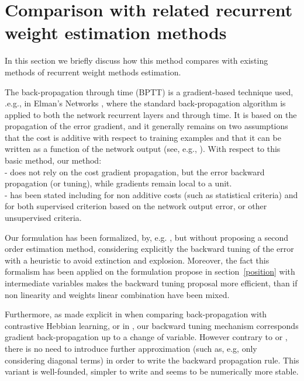 \section{Comparison with related recurrent weight estimation methods} \label{backpropag}

In this section we briefly discuss how this method compares with existing methods of recurrent weight methods estimation.

The back-propagation through time (BPTT) is a gradient-based technique used, .e.g., in Elman's Networks \cite{elman:90}, where the standard back-propagation algorithm is applied to both the network recurrent layers and through time. It is based on the propagation of the error gradient, and it generally remains on two assumptions that the cost is additive with respect to training examples and that it can be written as a function of the network output (see, e.g., \cite{Nielsen2015}). With respect to this basic method, our method:
\\- does not rely on the cost gradient propagation, but the error backward propagation (or tuning), while gradients remain local to a unit.
\\- has been stated including for non additive costs (such as statistical criteria) and for both supervised criterion based on the network output error, or other unsupervised criteria.

Our formulation has been formalized, by, e.g. \cite{cun_theoretical_1988}, but without proposing a second order estimation method, considering explicitly the backward tuning of the error with a heuristic to avoid extinction and explosion. Moreover, the fact this formalism has been applied on the formulation propose in section~\ref{position} with intermediate variables makes the backward tuning proposal more efficient, than if non linearity and weights linear combination have been mixed.

Furthermore, as made explicit in \cite{doi:10.1162/089976603762552988} when comparing back-propagation with contrastive Hebbian learning, or in \cite{cun_theoretical_1988}, our backward tuning mechanism corresponds gradient back-propagation up to a change of variable. However contrary to \cite{doi:10.1162/089976603762552988} or \cite{Hochreiter:1997}, there is no need to introduce further approximation (such as, e.g, only considering diagonal terms) in order to write the backward propagation rule. This variant is well-founded, simpler to write and seems to be numerically more stable.


